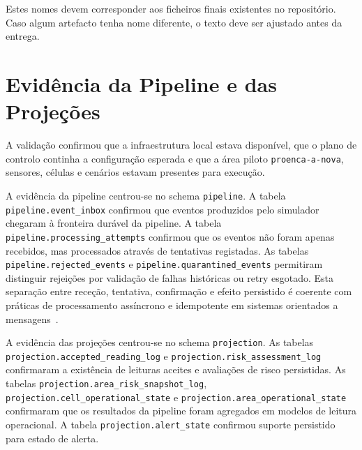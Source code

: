 Estes nomes devem corresponder aos ficheiros finais existentes no repositório. Caso algum artefacto tenha nome diferente, o texto deve ser ajustado antes da entrega.

\section{Evidência da Pipeline e das Projeções}

A validação confirmou que a infraestrutura local estava disponível, que o plano de controlo continha a configuração esperada e que a área piloto \texttt{proenca-a-nova}, sensores, células e cenários estavam presentes para execução.

A evidência da pipeline centrou-se no schema \texttt{pipeline}. A tabela \texttt{pipeline.event\_inbox} confirmou que eventos produzidos pelo simulador chegaram à fronteira durável da pipeline. A tabela \texttt{pipeline.processing\_attempts} confirmou que os eventos não foram apenas recebidos, mas processados através de tentativas registadas. As tabelas \texttt{pipeline.rejected\_events} e \texttt{pipeline.quarantined\_events} permitiram distinguir rejeições por validação de falhas históricas ou retry esgotado. Esta separação entre receção, tentativa, confirmação e efeito persistido é coerente com práticas de processamento assíncrono e idempotente em sistemas orientados a mensagens~\citep{rabbitmq_consumer_acknowledgements,richardson_idempotent_consumer}.

A evidência das projeções centrou-se no schema \texttt{projection}. As tabelas \texttt{projection.accepted\_reading\_log} e \texttt{projection.risk\_assessment\_log} confirmaram a existência de leituras aceites e avaliações de risco persistidas. As tabelas \texttt{projection.area\_risk\_snapshot\_log}, \texttt{projection.cell\_operational\_state} e \texttt{projection.area\_operational\_state} confirmaram que os resultados da pipeline foram agregados em modelos de leitura operacional. A tabela \texttt{projection.alert\_state} confirmou suporte persistido para estado de alerta.


